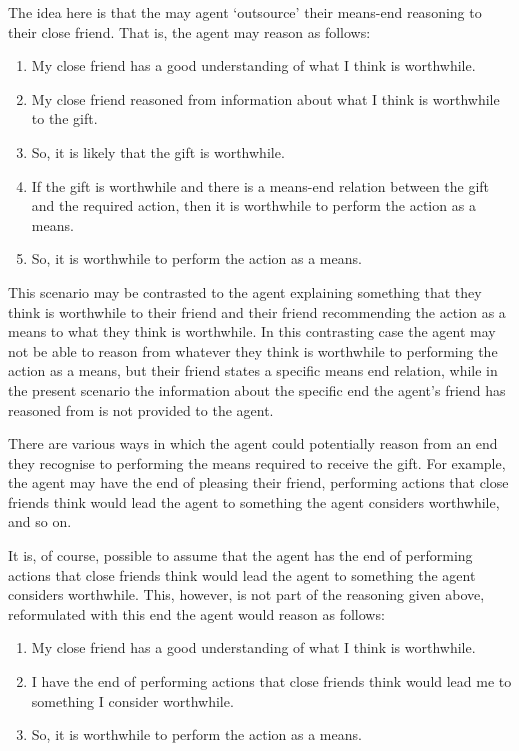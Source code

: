 \documentclass[10pt]{article}
\begin{document}
The idea here is that the may agent `outsource' their means-end reasoning to their close friend.
That is, the agent may reason as follows:
\begin{enumerate}
\item My close friend has a good understanding of what I think is worthwhile.
\item My close friend reasoned from information about what I think is worthwhile to the gift.
\item So, it is likely that the gift is worthwhile.
\item If the gift is worthwhile and there is a means-end relation between the gift and the required action, then it is worthwhile to perform the action as a means.
\item So, it is worthwhile to perform the action as a means.
\end{enumerate}

This scenario may be contrasted to the agent explaining something that they think is worthwhile to their friend and their friend recommending the action as a means to what they think is worthwhile.
In this contrasting case the agent may not be able to reason from whatever they think is worthwhile to performing the action as a means, but their friend states a specific means end relation, while in the present scenario the information about the specific end the agent's friend has reasoned from is not provided to the agent.

There are various ways in which the agent could potentially reason from an end they recognise to performing the means required to receive the gift.
For example, the agent may have the end of pleasing their friend, performing actions that close friends think would lead the agent to something the agent considers worthwhile, and so on.

It is, of course, possible to assume that the agent has the end of performing actions that close friends think would lead the agent to something the agent considers worthwhile.
This, however, is not part of the reasoning given above, reformulated with this end the agent would reason as follows:

\begin{enumerate}
\item My close friend has a good understanding of what I think is worthwhile.
\item I have the end of performing actions that close friends think would lead me to something I consider worthwhile.
\item So, it is worthwhile to perform the action as a means.
\end{enumerate}
\end{document}
